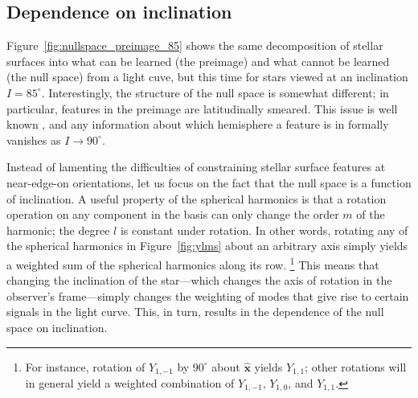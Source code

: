 \documentclass[modern]{aastex62}
\begin{document}

\subsection{Dependence on inclination}

Figure~\ref{fig:nullspace_preimage_85} shows the same decomposition
of stellar surfaces into what can be learned (the preimage) and what
cannot be learned (the null space) from a light cuve, but this time
for stars viewed at an inclination $I = 85^\circ$. Interestingly,
the structure of the null space is somewhat different; in particular,
features in the preimage are latitudinally smeared. This
issue is well known \citep[e.g.,][]{Cowan2009,Basri2020}, and any
information about which hemisphere a feature is in formally vanishes
as $I \rightarrow 90^\circ$.

Instead of lamenting the difficulties of constraining stellar surface features
at near-edge-on orientations, let us focus on the fact that the
null space is a function of inclination.
%
A useful property of
the spherical harmonics is that a rotation operation on any
component in the basis can only change the order $m$ of the
harmonic; the degree $l$ is constant under rotation. In other
words, rotating any of the spherical harmonics in Figure~\ref{fig:ylms}
about an arbitrary axis simply yields a weighted sum of the spherical
harmonics along its row.%
\footnote{For instance, rotation of $Y_{1,-1}$ by $90^\circ$ about
    $\hat{\mathbf{x}}$ yields $Y_{1,1}$; other rotations will in general
    yield a weighted combination of $Y_{1,-1}$, $Y_{1,0}$, and $Y_{1,1}$.}
This means that changing the inclination of the star---which changes
the axis of rotation in the observer's frame---simply changes the weighting
of modes that give rise to certain signals in the light curve.
This, in turn, results in the dependence of the null space on inclination.
\end{document}
